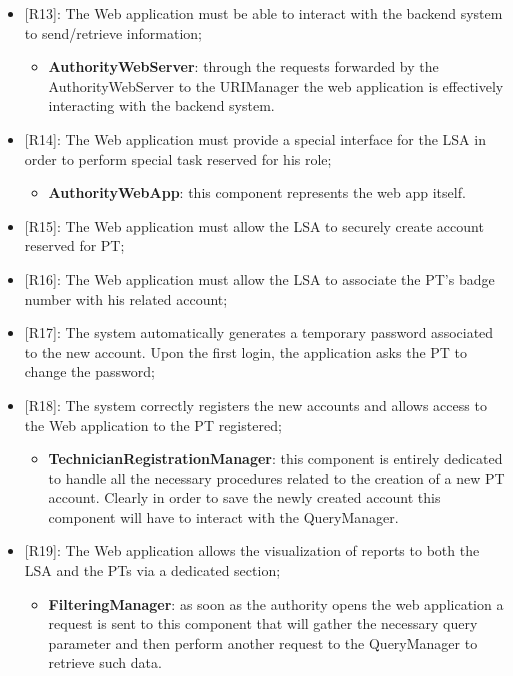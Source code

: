 \begin{itemize}
\begin{itemize}
    \end{itemize} 
    \item {[R13]}: The Web application must be able to interact with the backend system to send/retrieve information;
    \begin{itemize}
      \item \textbf{AuthorityWebServer}: through the requests forwarded by the AuthorityWebServer to the URIManager the web application is effectively interacting with the backend system.
    \end{itemize}     
    \item {[R14]}: The Web application must provide a special interface for the LSA in order to perform special task reserved for his role;
    \begin{itemize}
      \item \textbf{AuthorityWebApp}: this component represents the web app itself.
    \end{itemize}  
    \item {[R15]}: The Web application must allow the LSA to securely create account reserved for PT;  
    \item[] {[R16]}: The Web application must allow the LSA to associate the PT's badge number with his related account;
    \item[] {[R17]}: The system automatically generates a temporary password associated to the new account. Upon the first login, the application asks the PT to change the password;
    \item[] {[R18]}: The system correctly registers the new accounts and allows access to the Web application to the PT registered;
    \begin{itemize}
      \item \textbf{TechnicianRegistrationManager}: this component is entirely dedicated to handle all the necessary procedures related to the creation of a new PT account. Clearly in order to save the newly created account this component will have to interact with the QueryManager.
    \end{itemize} 
    \item {[R19]}: The Web application allows the visualization of reports to both the LSA and the PTs via a dedicated section;
    \begin{itemize}
      \item \textbf{FilteringManager}: as soon as the authority opens the web application a request is sent to this component that will gather the necessary query parameter and then perform another request to the QueryManager to retrieve such data.

\end{itemize}
\end{itemize}
